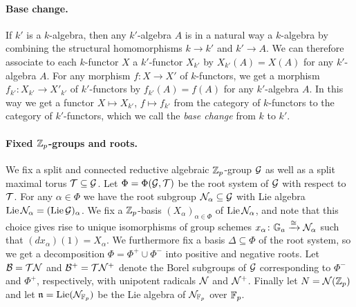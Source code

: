 \paragraph{Base change.} If $k'$ is a $k$-algebra, then any $k'$-algebra $A$ is in a natural way a $k$-algebra by combining the structural homomorphisms $k \to k'$ and $k' \to A$. We can therefore associate to each $k$-functor $X$ a $k'$-functor $X_{k'}$ by $X_{k'}(A) = X(A)$ for any $k'$-algebra $A$. For any morphism $f \colon X \to X'$ of $k$-functors, we get a morphism $f_{k'} \colon X_{k'} \to X'_{k'}$ of $k'$-functors by $f_{k'}(A) = f(A)$ for any $k'$-algebra $A$. In this way we get a functor $X \mapsto X_{k'}$, $f \mapsto f_{k'}$ from the category of $k$-functors to the category of $k'$-functors, which we call the \emph{base change} from $k$ to $k'$.

\paragraph{Fixed $\mathbb{Z}_{p}$-groups and roots.} We fix a split and connected reductive algebraic $\mathbb{Z}_{p}$-group $\mathcal{G}$ as well as a split maximal torus $\mathcal{T} \subseteq \mathcal{G}$. Let $\Phi = \Phi(\mathcal{G},\mathcal{T})$ be the root system of $\mathcal{G}$ with respect to $\mathcal{T}$. For any $\alpha \in \Phi$ we have the root subgroup $\mathcal{N}_{\alpha} \subseteq \mathcal{G}$ with Lie algebra $\operatorname{Lie} \mathcal{N}_{\alpha} =  (\operatorname{Lie} \mathcal{G})_{\alpha}$. We fix a $\mathbb{Z}_{p}$-basis $(X_{\alpha})_{\alpha \in \Phi}$ of $\operatorname{Lie} \mathcal{N}_{\alpha}$, and note that this choice gives rise to unique isomorphisms of group schemes $x_{\alpha} \colon \mathbb{G}_{a} \xrightarrow{\cong} \mathcal{N}_{\alpha}$ such that $(dx_\alpha)(1) = X_\alpha$. We furthermore fix a basis $\Delta \subseteq \Phi$ of the root system, so we get a decomposition $\Phi = \Phi^+ \cup \Phi^-$ into positive and negative roots. Let $\mathcal{B} = \mathcal{T}\mathcal{N}$ and $\mathcal{B}^+ = \mathcal{T}\mathcal{N}^+$ denote the Borel subgroups of $\mathcal{G}$ corresponding to $\Phi^-$ and $\Phi^+$, respectively, with unipotent radicals $\mathcal{N}$ and $\mathcal{N}^+$. Finally let $N = \mathcal{N}(\mathbb{Z}_{p})$ and let $\mathfrak{n} = \operatorname{Lie}(\mathcal{N}_{\mathbb{F}_p})$ be the Lie algebra of $\mathcal{N}_{\mathbb{F}_p}$ over $\mathbb{F}_p$.

